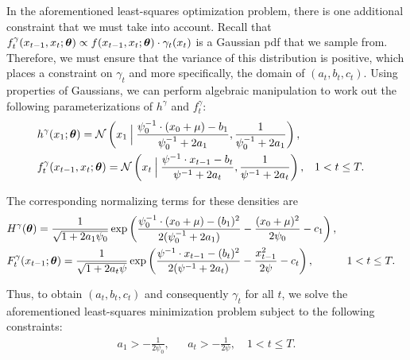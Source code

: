 \documentclass[twoside]{article}
\begin{document}
In the aforementioned least-squares optimization problem, there is one additional constraint that we must take into account.  Recall that $f_t^{\gamma}(x_{t-1}, x_t; \bd \theta) \propto f(x_{t-1}, x_t; \bd \theta) \cdot \gamma_t(x_t)$ is a Gaussian pdf that we sample from.  Therefore, we must ensure that the variance of this distribution is positive, which places a constraint on $\gamma_t$ and more specifically, the domain of $(a_t, b_t, c_t)$.  Using properties of Gaussians, we can perform algebraic manipulation to work out the following parameterizations of $h^\gamma$ and $f_t^\gamma$:
\begin{align*}
& h^\gamma(x_1; \bd \theta) = \Norm\left(x_1 \given[\Big] \frac{\psi_0^{-1} \cdot (x_0 + \mu) -b_1}{\psi_0^{-1} + 2a_1}, \frac{1}{\psi_0^{-1} + 2a_1}\right), \\
& f_t^\gamma(x_{t-1}, x_t; \bd \theta) = \Norm\left(x_t \given[\Big] \frac{\psi^{-1} \cdot x_{t-1} - b_t}{\psi^{-1} + 2a_t}, \frac{1}{\psi^{-1} + 2a_t}\right), & &1 < t \leq T.
\end{align*}

\noindent The corresponding normalizing terms for these densities are 
\begin{align*}
& H^\gamma(\bd \theta) = \frac{1}{\sqrt{1 + 2a_1 \psi_0}} \exp\left(\frac{\psi_0^{-1} \cdot (x_0 + \mu)  - (b_1)^2}{2(\psi_0^{-1} + 2a_1)} - \frac{ (x_0 + \mu)^2}{2 \psi_0} - c_1\right), \\
& F^\gamma_{t}(x_{t-1}; \bd \theta) =  \frac{1}{\sqrt{1 + 2a_t \psi}} \exp\left(\frac{\psi^{-1} \cdot x_{t-1}  - (b_t)^2}{2(\psi^{-1} + 2 a_t)} - \frac{x_{t-1}^2}{2\psi} - c_t\right), & & 1 < t \leq T.
\end{align*}

\noindent Thus, to obtain $(a_t, b_t, c_t)$ and consequently $\gamma_t$ for all $t$, we solve the aforementioned least-squares minimization problem subject to the following constraints:
\begin{align*}
a_1 > - \frac{1}{2\psi_0}, & & a_t > -\frac{1}{2\psi}, \quad 1 < t \leq T.
\end{align*}
\end{document}
